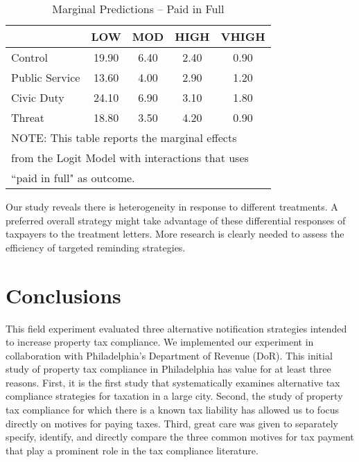 \documentclass[12pt,titlepage]{article}
\begin{document}
\begin{table}[htbp]
\caption{Marginal Predictions -- Paid in Full}  \label{TT}
\bigskip
\begin{center}
\begin{tabular}{| l | c | c | c | c |}
  \hline
 & LOW & MOD & HIGH & VHIGH \\ 
  \hline
Control & 19.90 & 6.40 & 2.40 & 0.90 \\ 
  Public Service & 13.60 & 4.00 & 2.90 & 1.20 \\ 
  Civic Duty & 24.10 & 6.90 & 3.10 & 1.80 \\ 
  Threat & 18.80 & 3.50 & 4.20 & 0.90 \\ 
   \hline
\multicolumn{5}{l}{NOTE: This table reports the marginal effects} \\
\multicolumn{5}{l}{from the Logit Model with interactions that uses} \\
\multicolumn{5}{l}{``paid in full" as outcome.} \\
\end{tabular}
\end{center}
\end{table}

Our study reveals there is heterogeneity in response to different
treatments.  A preferred overall strategy might take advantage of
these differential responses of taxpayers to the treatment
letters. More research is clearly needed to assess the efficiency of
targeted reminding strategies.


\section{Conclusions}

This field experiment evaluated three alternative notification
strategies intended to increase property tax compliance.  We 
implemented our experiment in collaboration with Philadelphia's
Department of Revenue (DoR).  This initial study of property
tax compliance in Philadelphia has value for at least three reasons.
First, it is the first study that systematically examines alternative
tax compliance strategies for taxation in a large city.  Second, the
study of property tax compliance for which there is a known tax
liability has allowed us to focus directly on motives for paying
taxes.  Third, great care was given to separately specify, identify,
and directly compare the three common motives for tax payment that
play a prominent role in the tax compliance literature.
\end{document}
